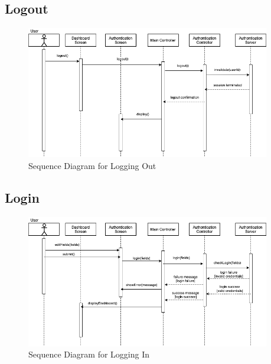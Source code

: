 \documentclass[]{article}
\begin{document}
\subsection{Logout}
\label{sub:logout_seq}
\begin{figure}[H]
\begin{center}
\includegraphics[width=0.95\textwidth]{D3/images/LogoutSeq.png}
\end{center}
\caption{Sequence Diagram for Logging Out}
\label{fig:Logout}
\end{figure}

\subsection{Login}
\label{sub:login_seq}
\begin{figure}[H]
\begin{center}
\includegraphics[width=0.95\textwidth]{D3/images/LoginSeq.png}
\end{center}
\caption{Sequence Diagram for Logging In}
\label{fig:Sequence Diagram for login}
\end{figure}
\end{document}

